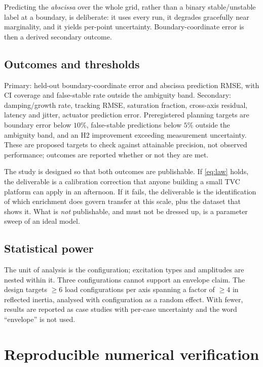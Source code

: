 \documentclass[11pt,a4paper]{article}
\begin{document}
Predicting the \emph{abscissa} over the whole grid, rather than a binary stable/unstable label at a
boundary, is deliberate: it uses every run, it degrades gracefully near marginality, and it yields
per-point uncertainty. Boundary-coordinate error is then a derived secondary outcome.

\subsection{Outcomes and thresholds}

Primary: held-out boundary-coordinate error and abscissa prediction RMSE, with CI coverage and
false-stable rate outside the ambiguity band. Secondary: damping/growth rate, tracking RMSE,
saturation fraction, cross-axis residual, latency and jitter, actuator prediction error. Preregistered
planning targets are boundary error below $10\%$, false-stable predictions below $5\%$ outside the
ambiguity band, and an H2 improvement exceeding measurement uncertainty. These are proposed targets
to check against attainable precision, not observed performance; outcomes are reported whether or not
they are met.

The study is designed so that both outcomes are publishable. If \eqref{eq:law} holds, the deliverable
is a calibration correction that anyone building a small TVC platform can apply in an afternoon. If
it fails, the deliverable is the identification of which enrichment does govern transfer at this
scale, plus the dataset that shows it. What is \emph{not} publishable, and must not be dressed up, is
a parameter sweep of an ideal model.

\subsection{Statistical power}

The unit of analysis is the configuration; excitation types and amplitudes are nested within it.
Three configurations cannot support an envelope claim. The design targets $\geq 6$ load
configurations per axis spanning a factor of $\geq 4$ in reflected inertia, analysed with
configuration as a random effect. With fewer, results are reported as case studies with per-case
uncertainty and the word ``envelope'' is not used.

\section{Reproducible numerical verification}
\end{document}
